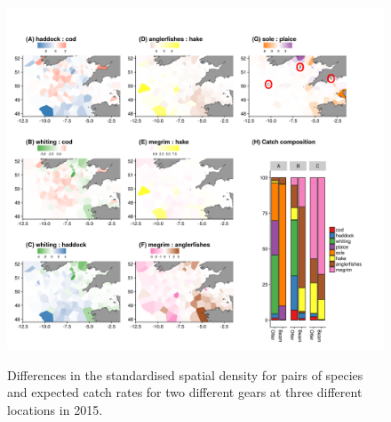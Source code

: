 \documentclass{nature}
\begin{document}
\begin{figure}
\begin{center}
	\includegraphics[width = \linewidth]{"Figure 4 - DensityDifferencesFigureswithCC"}
	\label{fig:4}
	\caption{Differences in the standardised spatial density for pairs of
		species and expected catch rates for two different gears at
		three different locations in 2015.}
\end{center}
\end{figure}
\end{document}
